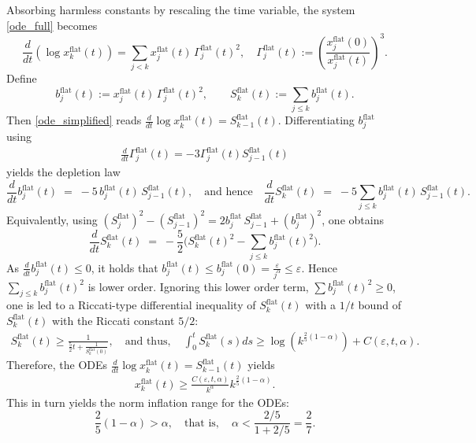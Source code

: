 \documentclass[reqno,11pt]{amsart}
\begin{document}
Absorbing harmless constants by rescaling the time variable, the system \eqref{ode_full} becomes
\begin{equation}\label{ode_simplified}
    \frac{d}{dt} (\log x_k^{\mathrm{flat}}(t))
    =
    \sum_{j<k} x_j^{\mathrm{flat}}(t)\,\Gamma_j^{\mathrm{flat}}(t)^2, 
    \quad
    \Gamma_j^{\mathrm{flat}}(t)
    := 
    \left(
    \frac{x_j^{\mathrm{flat}}(0)}{x_j^{\mathrm{flat}}(t)}
    \right)^3.
\end{equation}
Define
\[
    b_j^{\mathrm{flat}}(t):=x_j^{\mathrm{flat}}(t)\,\Gamma_j^{\mathrm{flat}}(t)^2,
    \qquad
    S_k^{\mathrm{flat}}(t):=\sum_{j\le k} b_j^{\mathrm{flat}}(t).
\]
Then \eqref{ode_simplified} reads $\frac{d}{dt}\log x_k^{\mathrm{flat}}(t)=S_{k-1}^{\mathrm{flat}}(t)$.
Differentiating $b_j^{\mathrm{flat}}$ using 
\begin{align*}
\frac{d}{dt}\Gamma_j^{\mathrm{flat}}(t)=-3\Gamma_j^{\mathrm{flat}}(t)S_{j-1}^{\mathrm{flat}}(t)
\end{align*}
yields the 
depletion law
\begin{equation}\label{ode_bj}
    \frac{d}{dt}b_j^{\mathrm{flat}}(t)\;=\;-5\,b_j^{\mathrm{flat}}(t)\,S_{j-1}^{\mathrm{flat}}(t),
\quad \text{and hence}\quad
    \frac{d}{dt}S_k^{\mathrm{flat}}(t)
    \;=\;
    -5\sum_{j\le k} b_j^{\mathrm{flat}}(t)\,S_{j-1}^{\mathrm{flat}}(t).
\end{equation}
Equivalently, using $(S_j^{\mathrm{flat}})^2-(S_{j-1}^{\mathrm{flat}})^2 = 2b_j^{\mathrm{flat}}\, S_{j-1}^{\mathrm{flat}}+(b_j^{\mathrm{flat}})^2$, one obtains
\begin{equation}\label{ode_Sk_quad}
    \frac{d}{dt}S_k^{\mathrm{flat}}(t)
    \;=\;
    -\frac{5}{2}\Big(S_k^{\mathrm{flat}}(t)^2-\sum_{j\le k} b_j^{\mathrm{flat}}(t)^2\Big).
\end{equation}
As $\frac{d}{dt}b_j^{\mathrm{flat}}(t)\leq0$, it holds that $b_j^{\mathrm{flat}}(t)\leq b_j^{\mathrm{flat}}(0)=\frac{\varepsilon}{j^\alpha}\leq \varepsilon$. Hence  $\sum_{j\le k} b_j^{\mathrm{flat}}(t)^2$ is lower order. Ignoring this lower order term, $\sum b_j^{\mathrm{flat}}(t)^2\geq 0$, one is led to a Riccati-type differential inequality  of $S_k^{\mathrm{flat}}(t)$ with a $1/t$ bound of $S_k^{\mathrm{flat}}(t)$ with the Riccati constant $5/2$:
    \begin{align}
    \label{low_bd_skt}
        S_k^{\mathrm{flat}}(t) \geq \frac{1}{\frac{5}{2}t+ \frac{1}{S_k^{\mathrm{flat}}(0)}}, 
    \quad \text{and thus},
    \quad 
        \int_0^t S_k^{\mathrm{flat}}(s) ds \geq
        \log (k^{\frac{2}{5}(1-\alpha)})+C(\varepsilon,t,\alpha).
    \end{align}
Therefore, the ODEs $\frac{d}{dt} \log x_k^{\mathrm{flat}}(t)= S_{k-1}^{\mathrm{flat}}(t)$ yields
    \begin{align*}
        x_k^{\mathrm{flat}}(t) \geq
        \frac{C(\varepsilon,t,\alpha)}{k^\alpha} k^{\frac{2}{5}(1-\alpha)}.
    \end{align*}
This in turn yields the norm inflation range for the ODEs:
\begin{equation}
\label{27_ni_range}
    \frac{2}{5}(1-\alpha)>\alpha, 
    \quad \text{that is}, 
    \quad
    \alpha< \frac{2/5}{1+2/5}=\frac{2}{7}.
\end{equation}
\end{document}
